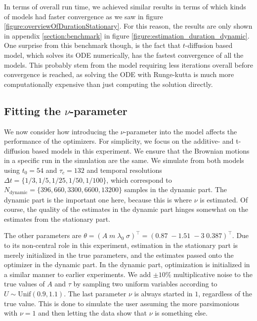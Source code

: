In terms of overall run time, we achieved similar results in terms of which kinds of models had faster convergence as we saw in figure \ref{figure:overviewOfDurationStationary}. For this reason, the results are only shown in appendix \ref{section:benchmark} in figure \ref{figure:estimation_duration_dynamic}. One surprise from this benchmark though, is the fact that $t$-diffusion based model, which solves its ODE numerically, has the fastest convergence of all the models. This probably stem from the model requiring less iterations overall before convergence is reached, as solving the ODE with Runge-kutta is much more computationally expensive than just computing the solution directly.
\subsection{Fitting the \texorpdfstring{$\nu$}{nu}-parameter}
We now consider how introducing the $\nu$-parameter into the model affects the performance of the optimizers. For simplicity, we focus on the additive- and t-diffusion based models in this experiment. We ensure that the Brownian motions in a specific run in the simulation are the same. We simulate from both models using $t_0 = 54$ and $\tau_c = 132$ and temporal resolutions $\Delta t = \{1/3, 1/5, 1/25, 1/50, 1/100\}$, which correspond to $N_\mathrm{dynamic} = \{396, 660, 3300, 6600, 13200\}$ samples in the dynamic part. The dynamic part is the important one here, because this is where $\nu$ is estimated. Of course, the quality of the estimates in the dynamic part hinges somewhat on the estimates from the stationary part.

The other parameters are $\theta = (A\; m\; \lambda_0\; \sigma)^\top = (0.87\; -1.51\; -3\;  0.387)^\top$. Due to its non-central role in this experiment, estimation in the stationary part is merely initialized in the true parameters, and the estimates passed onto the optimizer in the dynamic part. In the dynamic part, optimization is initialized in a similar manner to earlier experiments. We add $\pm 10\%$ multiplicative noise to the true values of $A$ and $\tau$ by sampling two uniform variables according to $U\sim \mathrm{Unif}(0.9,1.1)$. The last parameter $\nu$ is always started in $1$, regardless of the true value. This is done to simulate the user assuming the more parsimonious with $\nu = 1$ and then letting the data show that $\nu$ is something else. 

